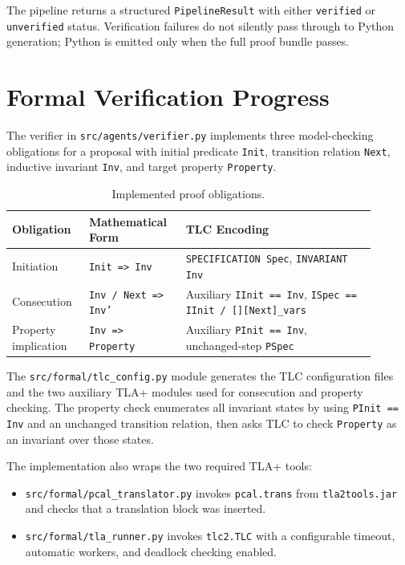 \documentclass[11pt]{article}
\begin{document}
The pipeline returns a structured \texttt{PipelineResult} with either
\texttt{verified} or \texttt{unverified} status. Verification failures do not
silently pass through to Python generation; Python is emitted only when the
full proof bundle passes.

\section{Formal Verification Progress}

The verifier in \texttt{src/agents/verifier.py} implements three model-checking
obligations for a proposal with initial predicate \texttt{Init}, transition
relation \texttt{Next}, inductive invariant \texttt{Inv}, and target property
\texttt{Property}.

\begin{table}[h]
\centering
\begin{tabular}{p{0.18\linewidth}p{0.24\linewidth}p{0.48\linewidth}}
\toprule
Obligation & Mathematical Form & TLC Encoding \\
\midrule
Initiation & \texttt{Init => Inv} &
\texttt{SPECIFICATION Spec}, \texttt{INVARIANT Inv} \\
Consecution & \texttt{Inv /\ Next => Inv'} &
Auxiliary \texttt{IInit == Inv}, \texttt{ISpec == IInit /\ [][Next]\_vars} \\
Property implication & \texttt{Inv => Property} &
Auxiliary \texttt{PInit == Inv}, unchanged-step \texttt{PSpec} \\
\bottomrule
\end{tabular}
\caption{Implemented proof obligations.}
\end{table}

The \texttt{src/formal/tlc\_config.py} module generates the TLC configuration
files and the two auxiliary TLA+ modules used for consecution and property
checking. The property check enumerates all invariant states by using
\texttt{PInit == Inv} and an unchanged transition relation, then asks TLC to
check \texttt{Property} as an invariant over those states.

The implementation also wraps the two required TLA+ tools:

\begin{itemize}
  \item \texttt{src/formal/pcal\_translator.py} invokes
  \texttt{pcal.trans} from \texttt{tla2tools.jar} and checks that a translation
  block was inserted.
  \item \texttt{src/formal/tla\_runner.py} invokes \texttt{tlc2.TLC} with a
  configurable timeout, automatic workers, and deadlock checking enabled.
\end{itemize}
\end{document}
